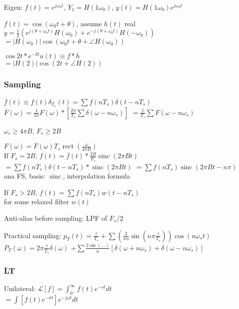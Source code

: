 \documentclass[4pt]{article}
\theoremstyle{definition}
\theoremstyle{definition}
\renewcommand{\o}{\omega}
\newcommand{\ulint}{\int_{0^-}^{\infty}}    %
\DeclareMathOperator{\rect}{rect}
\DeclareMathOperator{\sinc}{sinc}
\begin{document}
    Eigen: $f(t) = e^{j\o_0t}$, \(Y_1 = H(1\o_0)\), $y(t) = H(1\o_0) e^{j\o_0 t}$

    $f(t) = \cos(\o_0 t + \theta)$, assume $h(t)$ real\\
    \(y = \frac 1 2 (e^{j(\theta + \o_0 t)}H(\o_0) + e^{-j(\theta + \o_0 t)}H(-\o_0))\)\\          %
    \(=|H(\o_0)| \cos(\o_0t + \theta + \angle H(\o_0))\)

    \(\cos 2t * e^{-3t} u(t) \equiv f * h\)\\       %
    \(=|H(2)| \cos(2t + \angle H(2))\)              %
\subsubsection {Sampling}
    \(\overline{f}(t)\equiv f(t) \delta_{T_s}(t) = \sum f(nT_s) \delta(t - nT_s)\)\\
    \(\overline{F}(\o) = \frac{1}{2\pi} F(\o) * [\frac{2\pi}{T_s} \sum\delta(\o - n\o_s)]\)
    \(= \frac{1}{T_s}\sum F(\o - n\o_s)\)

    $\o_s \geq 4\pi B$, $F_s \geq 2B$

    \(F(\o) = \overline{F}(\o) T_s \rect(\frac{\o}{4\pi B})\)\\   %
    If $F_s = 2B$, \(f(t) = \overline{f}(t) * \frac{2B}{F_s} \sinc(2\pi Bt)\)\\       %
    \(=\sum f(nT_s)\delta(t - nT_s) * \sinc(2\pi B t)\)
    \(= \sum f(nT_s) \sinc(2\pi Bt - n\pi)\)\\
    ana FS, basis: $\sinc$, interpolation formula

    If $F_s > 2B$, \(f(t) = \sum f(nT_s) w(t - nT_s)\)\\
    for some relaxed filter $w(t)$

    Anti-alias before sampling: LPF of $F_s/2$

    Practical sampling: \(p_T(t) = \frac{\tau}{T_s} + \sum(\frac{2}{\pi n}\sin(n\pi\frac{\tau}{T_s}))\cos(n\omega_s t)\)\\
    \(P_T(\o) = 2\pi \frac{\tau}{T_s}\delta(\o)\)
    \(+ \sum\frac{2\sin(...)}{n}[\delta(\o + n\o_s) + \delta(\o - n\o_s)]\)       %

\subsubsection{LT}
Unilateral: \(\mathcal{L}[f] = \ulint f(t) e^{-st} dt\)\\          %
\(= \int [f(t) e^{-\sigma t}] e^{-j\o t} dt\)
\end{document}
